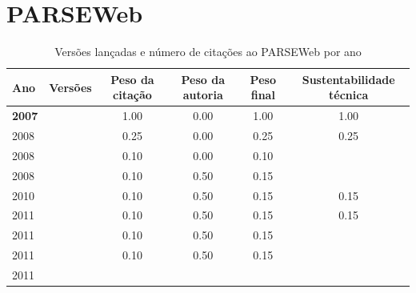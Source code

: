 \section{PARSEWeb}


\begin{table}[H]
\caption{Versões lançadas e número de citações ao PARSEWeb por ano}
\centering
\begin{tabular}{| l | c | c | c | c | c |}
  \hline
  Ano & Versões & Peso da citação & Peso da autoria & Peso final & Sustentabilidade técnica \\
  \hline
            {\bf 2007}
          &
          
          &
          1.00
          &
          0.00
          &
          1.00
          &
            {\color{blue} 1.00}
          \\
\hline
            2008
          &
          
          &
          0.25
          &
          0.00
          &
          0.25
          &
            {\color{red} 0.25}
          \\
            2008
          &
          
          &
          0.10
          &
          0.00
          &
          0.10
          &
          \\
            2008
          &
          
          &
          0.10
          &
          0.50
          &
          0.15
          &
          \\
\hline
            2010
          &
          
          &
          0.10
          &
          0.50
          &
          0.15
          &
            {\color{red} 0.15}
          \\
\hline
            2011
          &
          
          &
          0.10
          &
          0.50
          &
          0.15
          &
            {\color{red} 0.15}
          \\
            2011
          &
          
          &
          0.10
          &
          0.50
          &
          0.15
          &
          \\
            2011
          &
          
          &
          0.10
          &
          0.50
          &
          0.15
          &
          \\
            2011
          &
          

\end{tabular}
\end{table}

